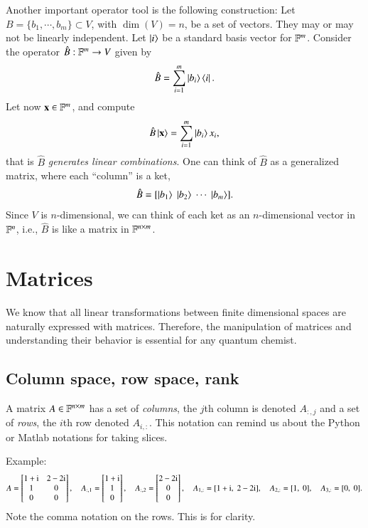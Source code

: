 Another important operator tool is the following construction: Let $B = \{b_1,\cdots,b_m\} \subset V$, with $\dim(V) = n$, be a set of vectors. They may or may not be linearly independent. Let $\ket{i}$ be a standard basis vector for $\mathbb{F}^m$. Consider the operator $\hat{B} : \mathbb{F}^m \to V$ given by
\begin{equation}
    \hat{B} = \sum_{i=1}^m \ket{b_i}\bra{i}.
\end{equation}
Let now $\mathbf{x}\in \mathbb{F}^m$, and compute
\begin{equation}
    \hat{B}\ket{\mathbf{x}} = \sum_{i=1}^m \ket{b_i} x_i,
\end{equation}
that is $\hat{B}$ \emph{generates linear combinations}. One can think of $\hat{B}$ as a generalized matrix, where each ``column'' is a ket,
\begin{equation}
    \hat{B} = [\ket{b_1}\; \ket{b_2}\; \cdots \; \ket{b_m}].
\end{equation}
Since $V$ is $n$-dimensional, we can think of each ket as an $n$-dimensional vector in $\mathbb{F}^n$, i.e., $\hat{B}$ is like a matrix in $\mathbb{F}^{n\times m}$.






\section{Matrices}

We know that all linear transformations between finite dimensional spaces are naturally expressed with matrices. Therefore, the manipulation of matrices and understanding their behavior is essential for any quantum chemist.


\subsection{Column space, row space, rank}

A matrix $A \in \mathbb{F}^{n\times m}$ has a set of \emph{columns}, the $j$th column is denoted $A_{:,j}$ and a set of \emph{rows}, the $i$th row denoted $A_{i,:}$. This notation can remind us about the Python or Matlab notations for taking slices.

Example:
\begin{equation}
    A = \begin{bmatrix} 1 + \mathrm{i} & 2 - 2\mathrm{i} \\ 1 & 0 \\ 0 & 0 \end{bmatrix}, \quad A_{:,1} = \begin{bmatrix} 1 + \mathrm{i} \\ 1 \\ 0 \end{bmatrix}, \quad A_{:,2} = \begin{bmatrix} 2 - 2\mathrm{i} \\ 0 \\ 0 \end{bmatrix}, \quad A_{1,:} = [1+\mathrm{i},\; 2-2\mathrm{i}], \quad A_{2,:} = [1,\; 0], \quad A_{3,:} = [0,\; 0].
\end{equation}
Note the comma notation on the rows. This is for clarity.

